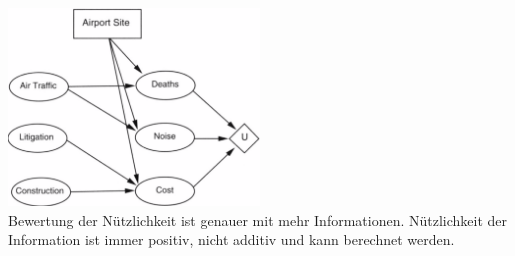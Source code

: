 \documentclass[12pt]{article}
\begin{document}
	\includegraphics[width=0.5\textwidth]{figures/entscheidungsnetz.png}\\
	Bewertung der Nützlichkeit ist genauer mit mehr Informationen. Nützlichkeit der Information ist immer positiv, nicht additiv und kann berechnet werden.
	
\end{document}

